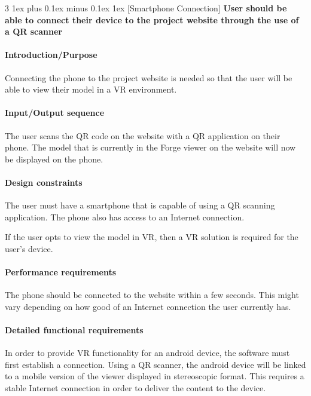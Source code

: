 \documentclass[letterpaper, 10pt, draftclsnofoot, compsoc, onecolumn]{IEEEtran}
\makeatletter
\def\subsubsection{\@startsection{subsubsection}%
                                 {3}%
                                 {\z@}%
                                 {1ex plus 0.1ex minus 0.1ex}%
                                 {1ex}%
                                 {\normalfont\normalsize}}%
\makeatother
\begin{document}

\subsubsection[{Smartphone Connection}]{\rmfamily\bfseries\color{black} User should be able to connect their 
	device to the project website through the use of a QR scanner
}


\paragraph[Introduction/Purpose of this
feature]{\rmfamily\bfseries\color{black}
Introduction/Purpose }
	Connecting the phone to the project website is needed so that the user will be able to view their model in a VR environment. 

\paragraph[Input/Output sequence for this
feature]{\rmfamily\bfseries\color{black}
Input/Output sequence }
	The user scans the QR code on the website with a QR application on their phone. The model that is currently in the Forge viewer
	on the website will now be displayed on the phone. 

\paragraph[Design constraints of this
feature]{\rmfamily\bfseries\color{black} Design
constraints }
	The user must have a smartphone that is capable of using a QR scanning application. The phone also has access to an Internet 
	connection. 
	
	If the user opts to view the model in VR, then a VR solution is required for the user's device.

\paragraph[Performance requirements of this
feature]{\rmfamily\bfseries\color{black}
Performance requirements }
	The phone should be connected to the website within a few seconds. This might vary depending on how good of an Internet 
	connection the user currently has. 

\paragraph[Detailed functional requirements of this
feature]{\rmfamily\bfseries\color{black}
Detailed functional requirements }
	In order to provide VR functionality for an android device, the software must first establish a connection. Using a QR scanner, 
	the android device will be linked to a mobile version of the viewer displayed in stereoscopic format. This requires a stable 
	Internet connection in order to deliver the content to the device.
\end{document}

